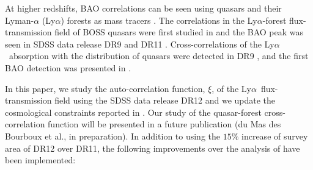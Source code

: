 \documentclass{aa}
\newcommand{\xif}{\xi}
\newcommand{\lya}{Ly$\alpha$}
\newcommand{\Lya}{Ly$\alpha$~}
\begin{document}
At higher redshifts, BAO correlations can be seen using
quasars and their Lyman-$\alpha$ (\lya) forests as mass
tracers \citep{2007PhRvD..76f3009M}.
The correlations in the \lya-forest flux-transmission field 
of  BOSS quasars were first studied in 
\citet{2011JCAP...09..001S} and the BAO peak was seen in 
SDSS data release DR9 
\citep{2013A&A...552A..96B,2013JCAP...04..026S,2013JCAP...03..024K}
and DR11 \citep{2015A&A...574A..59D}.
Cross-correlations of the \lya\ absorption with the distribution of quasars
were detected in DR9 \citep{2013JCAP...05..018F}, and the first BAO detection
was presented in \citet{2014JCAP...05..027F}. 

In this paper, we study the auto-correlation function, $\xif$,
of the \Lya flux-transmission field
using the SDSS data
release DR12 and we update the  cosmological constraints
reported in \citet{2015A&A...574A..59D}.
Our study of the  quasar-forest cross-correlation function
will be presented in a future publication
(du Mas des Bourboux et al., in preparation). 
In addition to using the $15\%$  increase of survey area of DR12 over DR11, 
the following improvements over the analysis of \citet{2015A&A...574A..59D}
have been implemented:
\end{document}
